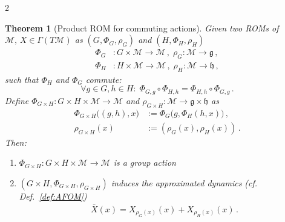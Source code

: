 \documentclass{article}
\newtheorem{theorem}{Theorem}[section]
\newcommand{\M}{\mathcal{M}}                                %
\newcommand{\g}{\mathfrak{g}}                               %
\newcommand{\appX}{\bar{X}}
\newcommand{\state}{x}
\newcommand{\appstate}{\bar{x}}
\begin{document}
\begin{multicols}{2}
\begin{theorem}[Product ROM for commuting actions]\label{thm:product_reduction}
    Given two ROMs of $\M,\, X\in \Gamma(T\M)$ as $(G,\Phi_G,\rho_G)$ and $(H,\Phi_H,\rho_H)$ 
    \begin{align}
        \Phi_G&:G\times\M\rightarrow\M \,,\; \rho_G:\M\rightarrow\g \,, \\
        \Phi_H&:H\times\M \rightarrow\M\,,\; \rho_H:\M\rightarrow\mathfrak{h}\,,
    \end{align}
    such that $\Phi_H$ and $\Phi_G$ commute:
    \begin{equation}
        \forall g\in G, h \in H: \; \Phi_{G,g} \circ \Phi_{H,h} = \Phi_{H,h} \circ \Phi_{G,g} \,.
    \end{equation}    
    Define $\Phi_{G\times H}: G\times H \times \M \rightarrow \M$ and $\rho_{G\times H}:\M \rightarrow \g \times \mathfrak{h}$ as%
    \begin{align}
        \Phi_{G\times H} \big((g,h),\state\big) &:= \Phi_G\big(g,\Phi_H(h,\state)\big) \,, \label{eq:product_action} \\ %
        \rho_{G\times H}(\state) &:= (\rho_G(\state),\rho_H(\state)) \label{eq:product_reduced_vector_field}\,.
    \end{align}
    Then:
    \begin{enumerate}
        \item $\Phi_{G\times H}: G\times H \times \M \rightarrow \M$ is a group action
        \item $(G\times H, \Phi_{G\times H}, \rho_{G\times H})$ induces the approximated dynamics (cf. Def.~\ref{def:AFOM}) 
        \begin{align}\label{eq:product_AFOM}
            \appX(\state) %
            = X_{\rho_G(\state)}(\state) + X_{\rho_H(\state)}(\state) \,.
        \end{align}

\end{enumerate}
\end{theorem}
\end{multicols}
\end{document}
